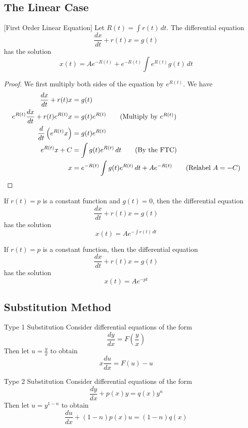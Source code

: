 \documentclass[a4paper]{article}
\begin{document}
\subsection{The Linear Case}
\begin{thm}{}{}[First Order Linear Equation] Let $R(t)=\int r(t)\,dt$. The differential equation $$\frac{dx}{dt}+r(t)x=g(t)$$ has the solution $$x(t)=Ae^{-R(t)}+e^{-R(t)}\int e^{R(t)}g(t)\,dt$$
\end{thm}
\begin{proof} We first multiply both sides of the equation by $e^{R(t)}$. We have
\begin{align*}
\frac{dx}{dt}+r(t)x&=g(t)\\
e^{R(t)}\frac{dx}{dt}+r(t)e^{R(t)}x&=g(t)e^{R(t)}\tag{Multiply by $e^{R(t)}$}\\
\frac{d}{dt}\left(e^{R(t)}x\right)&=g(t)e^{R(t)}\\
e^{R(t)}x+C&=\int g(t)e^{R(t)}\,dt\tag{By the FTC}\\
x&=e^{-R(t)}\int g(t)e^{R(t)}\,dt+Ae^{-R(t)}\tag{Relabel $A=-C$}
\end{align*}
\end{proof}

\begin{crl}{}{} If $r(t)=p$ is a constant function and $g(t)=0$, then the differential equation $$\frac{dx}{dt}+r(t)x=g(t)$$ has the solution $$x(t)=Ae^{-\int r(t)\,dt}$$
\end{crl}

\begin{crl}{}{} If $r(t)=p$ is a constant function, then the differential equation $$\frac{dx}{dt}+r(t)x=g(t)$$ has the solution $$x(t)=Ae^{-pt}$$
\end{crl}

\subsection{Substitution Method}
\begin{thm}{Type 1 Substitution}{} Consider differential equations of the form $$\frac{dy}{dx}=F\left(\frac{y}{x}\right)$$ Then let $u=\frac{y}{x}$ to obtain $$x\frac{du}{dx}=F(u)-u$$
\end{thm}

\begin{thm}{Type 2 Substitution}{} Consider differential equations of the form $$\frac{dy}{dx}+p(x)y=q(x)y^n$$ Then let $u=y^{1-n}$ to obtain $$\frac{du}{dx}+(1-n)p(x)u=(1-n)q(x)$$
\end{thm}
\end{document}

